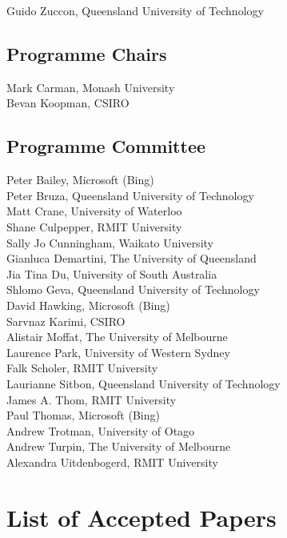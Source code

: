 \documentclass[a4paper]{article}
\begin{document}
Guido Zuccon, Queensland University of Technology


\subsection*{Programme Chairs}

Mark Carman, Monash University\\
Bevan Koopman, CSIRO\\

\subsection*{Programme Committee}
Peter Bailey, Microsoft (Bing)\\
Peter Bruza, Queensland University of Technology\\
Matt Crane, University of Waterloo\\
Shane Culpepper, RMIT University\\
Sally Jo Cunningham, Waikato University\\
Gianluca Demartini, The University of Queensland\\
Jia Tina Du, University of South Australia\\
Shlomo Geva, Queensland University of Technology\\
David Hawking, Microsoft (Bing)\\
Sarvnaz Karimi, CSIRO\\
Alistair Moffat, The University of Melbourne\\
Laurence Park, University of Western Sydney\\
Falk Scholer, RMIT University\\
Laurianne Sitbon, Queensland University of Technology\\
James A. Thom, RMIT University\\
Paul Thomas, Microsoft (Bing)\\
Andrew Trotman, University of Otago\\
Andrew Turpin, The University of Melbourne\\
Alexandra Uitdenbogerd, RMIT University\\

\newpage

\section*{List of Accepted Papers}
\end{document}
